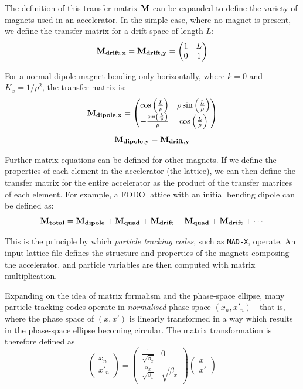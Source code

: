 \documentclass[a4paper,twoside,11pt]{report}
\begin{document}
The definition of this transfer matrix $\bf M$ can be expanded to define the variety of magnets used in an accelerator. In the simple case, where no magnet is present, we define the transfer matrix for a drift space of length $L$:
\begin{equation}
  \bf{M}_{drift,x}=\bf{M}_{drift,y}=
  \begin{pmatrix}
    1 & L \\
    0 & 1
  \end{pmatrix}
\end{equation}

For a normal dipole magnet bending only horizontally, where $k=0$ and $K_x=1/\rho^2$, the transfer matrix is:
\begin{equation}
  \bf{M}_{dipole,x}=
  \begin{pmatrix}
    \cos\left(\frac L\rho\right) & \rho\sin\left(\frac L\rho\right) \\
    -\frac{\sin\left(\frac L\rho\right)}{\rho} & \cos\left(\frac L\rho\right)
  \end{pmatrix}
\end{equation}
\begin{equation}
  \bf{M}_{dipole,y}=\bf{M}_{drift,y}
\end{equation}

Further matrix equations can be defined for other magnets. If we define the properties of each element in the accelerator (the lattice), we can then define the transfer matrix for the entire accelerator as the product of the transfer matrices of each element. For example, a FODO lattice with an initial bending dipole can be defined as:
\begin{equation}
  \bf{M}_{total} = \bf{M}_{dipole} + \bf{M}_{quad} + \bf{M}_{drift} - \bf{M}_{quad} + \bf{M}_{drift} +\cdots
\end{equation}

This is the principle by which \textit{particle tracking codes}, such as \verb|MAD-X|, operate. An input lattice file defines the structure and properties of the magnets composing the accelerator, and particle variables are then computed with matrix multiplication. 

Expanding on the idea of matrix formalism and the phase-space ellipse, many particle tracking codes operate in \textit{normalised} phase space $(x_n, x'_n)$---that is, where the phase space of $(x, x')$ is linearly transformed in a way which results in the phase-space ellipse becoming circular. The matrix transformation is therefore defined as
\begin{equation}
  \begin{pmatrix}
    x_n \\
    x'_n
  \end{pmatrix} = 
  \begin{pmatrix}
    \frac{1}{\sqrt{\beta_x}} & 0 \\
    \frac{\alpha_x}{\sqrt{\beta_x}} & \sqrt{\beta_x}
  \end{pmatrix} \begin{pmatrix}
    x \\
    x'
  \end{pmatrix}
  \label{eq:normalised}
\end{equation}
\end{document}
